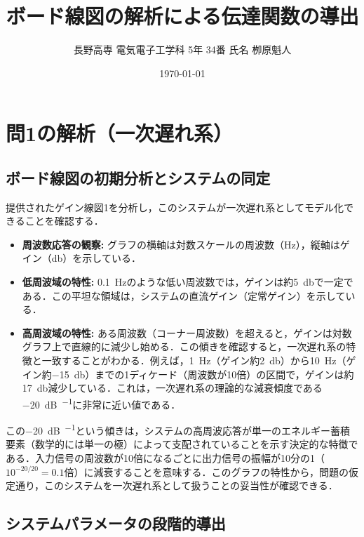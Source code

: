 \documentclass[11pt,a4paper]{ltjsarticle}
\newcommand{\supcite}[1]{\textsuperscript{\cite{#1}}}
\begin{document}
\title{ボード線図の解析による伝達関数の導出}
\author{長野高専 電気電子工学科 5年 34番 氏名 栁原魁人}
\date{\today}
\maketitle
\thispagestyle{fancy}

\section{問1の解析（一次遅れ系）}

\subsection{ボード線図の初期分析とシステムの同定}

提供されたゲイン線図1を分析し，このシステムが一次遅れ系としてモデル化できることを確認する．

\begin{itemize}
    \item \textbf{周波数応答の観察:} グラフの横軸は対数スケールの周波数（\si{\hertz}），縦軸はゲイン（\si{\decibel}）を示している\supcite{ref1}．
    \item \textbf{低周波域の特性:} \SI{0.1}{\hertz}のような低い周波数では，ゲインは約\SI{+5}{\decibel}で一定である\supcite{ref1}．この平坦な領域は，システムの直流ゲイン（定常ゲイン）を示している．
    \item \textbf{高周波域の特性:} ある周波数（コーナー周波数）を超えると，ゲインは対数グラフ上で直線的に減少し始める．この傾きを確認すると，一次遅れ系の特徴と一致することがわかる．例えば，\SI{1}{\hertz}（ゲイン約\SI{2}{\decibel}）から\SI{10}{\hertz}（ゲイン約\SI{-15}{\decibel}）までの1ディケード（周波数が10倍）の区間で，ゲインは約\SI{17}{\decibel}減少している．これは，一次遅れ系の理論的な減衰傾度である\SI{-20}{\dB\per\decade}に非常に近い値である\supcite{ref2}．
\end{itemize}

この\SI{-20}{\dB\per\decade}という傾きは，システムの高周波応答が単一のエネルギー蓄積要素（数学的には単一の極）によって支配されていることを示す決定的な特徴である．入力信号の周波数が10倍になるごとに出力信号の振幅が10分の1（$10^{-20/20} = 0.1$倍）に減衰することを意味する．このグラフの特性から，問題の仮定通り，このシステムを一次遅れ系として扱うことの妥当性が確認できる．

\subsection{システムパラメータの段階的導出}
\end{document}
